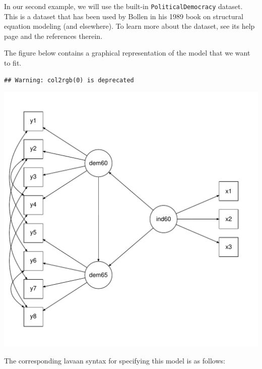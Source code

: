 In our second example, we will use the built-in
\texttt{PoliticalDemocracy} dataset. This is a dataset that has been
used by Bollen in his 1989 book on structural equation modeling (and
elsewhere). To learn more about the dataset, see its help page and the
references therein.

The figure below contains a graphical representation of the model that
we want to fit.

\begin{verbatim}
## Warning: col2rgb(0) is deprecated
\end{verbatim}

\includegraphics{figure/sem.pdf}

The corresponding lavaan syntax for specifying this model is as follows:

\begin{Shaded}
\begin{Highlighting}[]
\end{Highlighting}
\end{Shaded}

